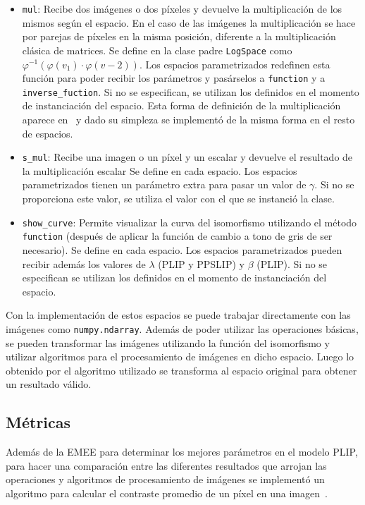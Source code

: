 \begin{itemize}
	\item \verb|mul|: Recibe dos im\'agenes o dos p\'ixeles y devuelve la multiplicaci\'on de los mismos seg\'un el espacio. En el caso de las im\'agenes la multiplicaci\'on se hace por parejas de p\'ixeles en la misma posici\'on, diferente a la multiplicaci\'on cl\'asica de matrices. Se define en la clase padre \verb|LogSpace| como $\varphi^{-1}(\varphi(v_1)\cdot\varphi(v-2))$. Los espacios parametrizados redefinen esta funci\'on para poder recibir los par\'ametros y pas\'arselos a \verb|function| y a \verb|inverse_fuction|. Si no se especifican, se utilizan los definidos en el momento de instanciaci\'on del espacio. Esta forma de definici\'on de la multiplicaci\'on aparece en~\cite{panetta2010parameterized} y dado su simpleza se implement\'o de la misma forma en el resto de espacios.
	\item \verb|s_mul|: Recibe una imagen o un p\'ixel y un escalar y devuelve el resultado de la multiplicaci\'on escalar Se define en cada espacio. Los espacios parametrizados tienen un par\'ametro extra para pasar un valor de $\gamma$. Si no se proporciona este valor, se utiliza el valor con el que se instanci\'o la clase.
	\item \verb|show_curve|: Permite visualizar la curva del isomorfismo utilizando el m\'etodo \verb|function| (despu\'es de aplicar la funci\'on de cambio a tono de gris de ser necesario). Se define en cada espacio. Los espacios parametrizados pueden recibir adem\'as los valores de $\lambda$ (PLIP y PPSLIP) y $\beta$ (PLIP). Si no se especifican se utilizan los definidos en el momento de instanciaci\'on del espacio.
\end{itemize}

Con la implementaci\'on de estos espacios se puede trabajar directamente con las im\'agenes como \verb|numpy.ndarray|. Adem\'as de poder utilizar las operaciones b\'asicas, se pueden transformar las im\'agenes utilizando la funci\'on del isomorfismo y utilizar algoritmos para el procesamiento de im\'agenes en dicho espacio. Luego lo obtenido por el algoritmo utilizado se transforma al espacio original para obtener un resultado v\'alido.

\subsection{M\'etricas}

Adem\'as de la EMEE para determinar los mejores par\'ametros en el modelo PLIP, para hacer una comparaci\'on entre las diferentes resultados que arrojan las operaciones y algoritmos de procesamiento de im\'agenes se implement\'o un algoritmo para calcular el contraste promedio de un p\'ixel en una imagen~\cite{patrascu2014mathematical}.

